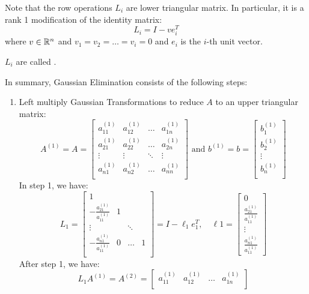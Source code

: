 \documentclass[../main/main.tex]{subfiles}
\begin{document}
\begin{remark}
  Note that the row operations $L_{i}$ are lower triangular matrix. In particular, it is a rank 1 modification of the identity matrix: \[
L_{i} = I - v e^{T}_{i}
  \] where $v \in \mathbb{R}^{n}$ and $v_1=v_2=\ldots=v_{i}=0$ and $e_{i}$ is the $i$-th unit vector.
\end{remark}
\begin{definition}
 $L_{i}$ are called .
\end{definition}
In summary, Gaussian Elimination consists of the following steps:
\begin{enumerate}
  \item Left multiply Gaussian Transformations to reduce $A$ to an upper triangular matrix: \[
A^{(1)} = A = \begin{bmatrix}
  a_{11}^{(1)} & a_{12}^{(1)} & \ldots & a_{1n}^{(1)}\\
  a_{21}^{(1)} & a_{22}^{(1)} & \ldots & a_{2n}^{(1)}\\
  \vdots & \vdots & \ddots &\vdots \\
  a_{n1}^{(1)} & a_{n2}^{(1)} & \ldots & a_{nn}^{(1)}\\
\end{bmatrix}\text{ and  } b^{(1)} = b = \begin{bmatrix}
b^{(1)}_{1} \\
b^{(1)}_{2} \\
\vdots \\
b^{(1)}_{n} \\
\end{bmatrix}
        \]
        In step 1, we have: \[
L_1 = \begin{bmatrix}
  1 &  & &\\
  -\frac{a_{21}^{(1)}}{a_{11}^{(1)}} & 1 & &\\
  \vdots &  & \ddots & \\
  -\frac{a_{n1}^{(1)}}{a_{11}^{(1)}} & 0 & \ldots& 1\\
\end{bmatrix} = I-\ell_{1} e^{T}_{1}, \quad \ell1 = \begin{bmatrix}
0 \\\frac{a_{21}^{(1)}}{a_{11}^{(1)}} \\ \vdots \\ \frac{a_{n1}^{(1)}}{a_{11}^{(1)}}
\end{bmatrix}
        \]
        After step 1, we have: \[
L_{1}A^{(1)} = A^{(2)} = \begin{bmatrix}
  a_{11}^{(1)} & a_{12}^{(1)} & \ldots & a_{1n}^{(1)}\\

\end{bmatrix}\]
\end{enumerate}
\end{document}
